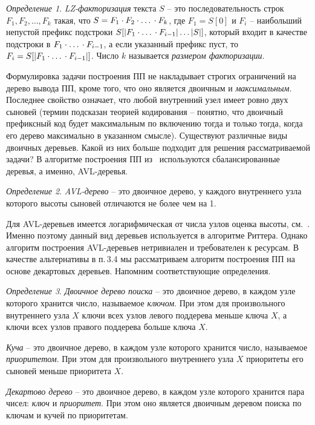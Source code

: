 ﻿\documentclass[11pt]{article}
\theoremstyle{remark}
\newtheorem{definition}{Определение}[section]
\newcommand{\substr}[2]{[#1\dots#2]}
\begin{document}
\begin{definition}
\emph{LZ-факторизация} текста $S$ -- это последовательность строк $F_1, F_2, \dots, F_k$ такая, что $S = F_1 \cdot F_2
\cdot \mbox{\dots} \cdot F_k$, где $F_1 = S[0]$ и $F_i$ -- наибольший непустой префикс подстроки $S\substr{|F_1\cdot
\mbox{\dots} \cdot F_{i-1}|}{|S|}$, который входит в качестве подстроки в $F_1 \cdot \mbox{\dots} \cdot F_{i-1}$, а
если указанный префикс пуст, то $F_i=S[|F_1\cdot \mbox{\dots} \cdot F_{i-1}|]$. Число $k$ называется \emph{размером
факторизации}.
\end{definition}

Формулировка задачи построения ПП не накладывает строгих ограничений на дерево вывода ПП, кроме того, что оно является двоичным и
\emph{максимальным}. Последнее свойство означает, что любой внутренний узел имеет ровно двух сыновей (термин подсказан теорией кодирования
-- понятно, что двоичный префиксный код будет максимальным по включению тогда и только тогда, когда его дерево максимально в указанном
смысле). Существуют различные виды двоичных деревьев. Какой из них больше подходит для решения рассматриваемой задачи? В алгоритме
построения ПП из~\cite{SLPConstruction} используются сбалансированные деревья, а именно, AVL-деревья.

\begin{definition}
\emph{AVL-дерево} -- это двоичное дерево, у каждого внутреннего узла которого высоты сыновей отличаются не более чем на 1.
\end{definition}

Для AVL-деревьев имеется логарифмическая от числа узлов оценка высоты, см.~\cite[пп.~6.2.3]{Knuth}. Именно поэтому данный вид деревьев
используется в алгоритме Риттера. Однако алгоритм построения AVL-деревьев нетривиален и требователен к ресурсам. В качестве альтернативы в
п.\,3.4  мы рассматриваем алгоритм построения ПП на основе декартовых деревьев. Напомним соответствующие определения.

\begin{definition}
\emph{Двоичное дерево поиска} -- это двоичное дерево, в каждом узле которого хранится число, называемое \emph{ключом}. При этом для
произвольного внутреннего узла $X$ ключи всех узлов левого поддерева меньше ключа $X$, а ключи всех узлов правого поддерева больше ключа
$X$.

\emph{Куча} -- это двоичное дерево, в каждом узле которого хранится число, называемое \emph{приоритетом}. При этом для произвольного
внутреннего узла $X$ приоритеты его сыновей меньше приоритета $X$.

\emph{Декартово дерево} -- это двоичное дерево, в каждом узле которого хранится пара чисел: \emph{ключ} и \emph{приоритет}. При этом оно
является двоичным деревом поиска по ключам и кучей по приоритетам.
\end{definition}
\end{document}
